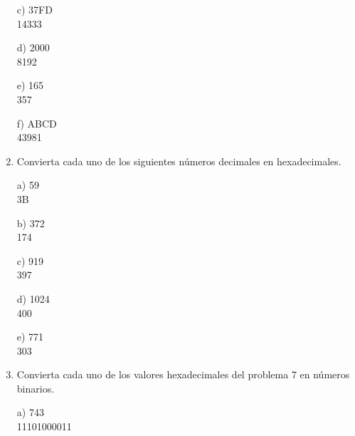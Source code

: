 \documentclass[a4paper, 12pt]{article}
\newcommand{\Aspace}{0.2cm}
\begin{document}
\begin{enumerate}
            \vspace{\Aspace} \par
            c) 37FD
            \\ { \color{azul} 14333 }

            \vspace{\Aspace} \par
            d) 2000
            \\ { \color{azul} 8192 }

            \vspace{\Aspace} \par
            e) 165
            \\ { \color{azul} 357 }

            \vspace{\Aspace} \par
            f) ABCD
            \\ { \color{azul} 43981 }


        \item Convierta cada uno de los siguientes números decimales en hexadecimales.
            \vspace{\Aspace} \par
            a) 59
            \\ { \color{azul} 3B }

            \vspace{\Aspace} \par
            b) 372
            \\ { \color{azul} 174 }

            \vspace{\Aspace} \par
            c) 919
            \\ { \color{azul} 397 }

            \vspace{\Aspace} \par
            d) 1024
            \\ { \color{azul} 400 }

            \vspace{\Aspace} \par
            e) 771
            \\ { \color{azul} 303 }


        \item Convierta cada uno de los valores hexadecimales del problema 7 en números binarios.
            \vspace{\Aspace} \par
            a) 743
            \\ { \color{azul} 11101000011 }


\end{enumerate}
\end{document}
